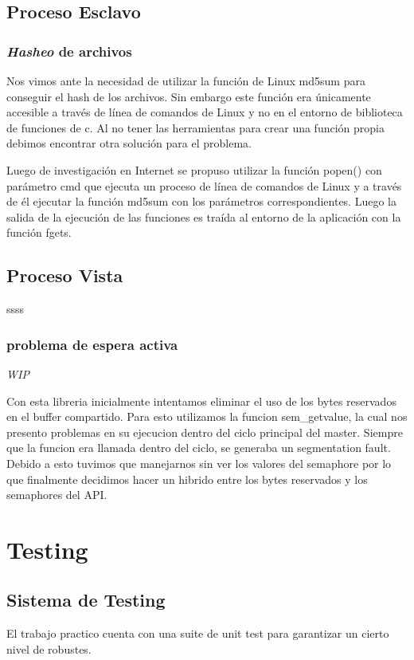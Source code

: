 \documentclass[10pt,a4paper]{report}
\begin{document}
\section{Proceso Esclavo}
\subsection{\textit{Hasheo} de archivos}
Nos vimos ante la necesidad de utilizar la función de Linux md5sum para conseguir el hash de los archivos. Sin embargo este función
era únicamente accesible a través de línea de comandos de Linux y no en el entorno de biblioteca de funciones de c. Al no tener las
herramientas para crear una función propia debimos encontrar otra solución para el problema.

Luego de investigación en Internet se propuso utilizar la función popen() con parámetro cmd que ejecuta un proceso de línea de comandos
de Linux y a través de él ejecutar la función md5sum con los parámetros correspondientes. Luego la salida de la ejecución de las funciones
es traída al entorno de la aplicación con la función fgets.
\section{Proceso Vista}
ssss
\subsection{problema de espera activa}
\emph{WIP}

	Con esta libreria inicialmente intentamos eliminar el uso de los bytes reservados en el buffer compartido. Para esto utilizamos la funcion sem\_getvalue, la cual nos presento problemas en su ejecucion dentro del ciclo principal del master.  Siempre que la funcion era llamada dentro del ciclo, se generaba un segmentation fault. Debido a esto tuvimos que manejarnos sin ver los valores del semaphore por lo que finalmente decidimos hacer un hibrido entre los bytes reservados y los semaphores del API.


\chapter{Testing}
\section{Sistema de Testing}
El trabajo practico cuenta con una suite de unit test para garantizar un cierto nivel de robustes.
\end{document}
